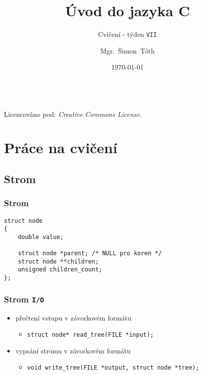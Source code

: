 

\title{Úvod do jazyka C}
\subtitle{Cvičení - týden \texttt{VII}}
\author[]{Mgr.~Šimon~Tóth}
\date{\today}

\newcommand{\CcNote}[1]{%
        Licencováno pod: \textit{Creative Commons #1 3.0 License}.%
}


	\begin{frame}
		\titlepage
		\vfill
		\begin{center}
			\\
			{\tiny\CcNote{\CcLongnameByNcSa}}
			\vspace*{2ex}
		\end{center}
	\end{frame}

\section{Práce na cvičení}
\subsection{Strom}

\begin{frame}[fragile]
	\frametitle{Strom}
\begin{verbatim}
struct node
{
    double value;

    struct node *parent; /* NULL pro koren */
    struct node **children;
    unsigned children_count;
};
\end{verbatim}
\end{frame}

\begin{frame}
	\frametitle{Strom \texttt{I/O}}
	\begin{itemize}
		\item přečtení vstupu v závorkovém formátu
		\begin{itemize} \item \texttt{struct node* read\_tree(FILE *input);} \end{itemize}
		\item vypsání stromu v závorkovém formátu
		\begin{itemize} \item \texttt{void write\_tree(FILE *output, struct node *tree);} \end{itemize}
	\end{itemize}
\end{frame}


